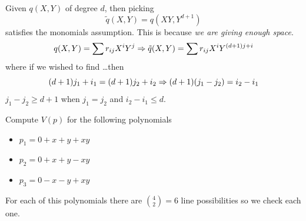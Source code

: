 \documentclass[12pt]{memoir}
\begin{document}
\begin{ptcb}
Given $q(X,Y)$ of degree $d$, then picking 
$$\tilde{q}(X,Y)=q(XY,Y^{d+1})$$
satisfies the monomials assumption. This is because \emph{we are giving enough space}.
$$q(X,Y)=\sum r_{ij}X^iY^j\Rightarrow \tilde{q}(X,Y)=\sum r_{ij}X^iY^{(d+1)j+i}$$
where if we wished to find \dots then 
$$(d+1)j_1+i_1=(d+1)j_2+i_2\Rightarrow (d+1)(j_1-j_2)=i_2-i_1$$
$j_1-j_2\geq d+1$ when $j_1=j_2$ and $i_2-i_1\leq d$.
\end{ptcb}

\begin{Ex}
    Compute $V(p)$ for the following polynomials
    \begin{itemize}
        \item $p_1=0+x+y+xy$
        \item $p_2=0+x+y-xy$
        \item $p_3=0-x-y+xy$
    \end{itemize}
    For each of this polynomials there are $\binom{4}{2}=6$ line possibilities so we check each one.
\end{Ex}



\ifx\nextra\undefined
\printindex
\else\fi
\nocite{*}


\end{document}
